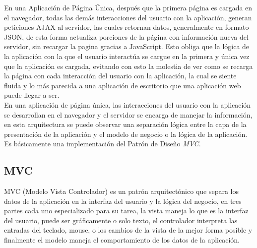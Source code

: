En una Aplicación de Página Única, después que la primera página es cargada en el navegador, todas las demás interacciones del usuario con la aplicación, generan peticiones AJAX al servidor, las cuales retornan datos, generalmente en formato JSON, de esta forma actualiza porciones de la página con información nueva del servidor, sin recargar la pagina gracias a JavaScript. Esto obliga que la lógica de la aplicación con la que el usuario interactúa se cargue en la primera y única vez que la aplicación es cargada, evitando con esto la molestia de ver como se recarga la página con cada interacción del usuario con la aplicación, la cual se siente fluida y lo más parecida a una aplicación de escritorio que una aplicación web puede llegar a ser.\\





%

En una aplicación de página única, las interacciones del usuario con la aplicación se desarrollan en el navegador y el servidor se encarga de manejar la información, en esta arquitectura se puede observar una separación lógica entre la capa de la presentación de la aplicación y el modelo de negocio o la lógica de la aplicación. Es básicamente una implementación del Patrón de Diseño \emph{MVC}.\\


\subsection{MVC} %
\label{sub:mvc}
  MVC (Modelo Vista  Controlador) es un patrón arquitectónico que separa
  los datos de la aplicación en la interfaz del usuario y  la lógica del
  negocio, en tres partes cada uno especializado para su tarea, la vista
  maneja lo que es la interfaz del usuario, puede ser gráficamente o solo texto,
  el controlador interpreta las entradas del teclado, mouse, o los cambios
  de la vista de la mejor forma posible y finalmente el modelo maneja el comportamiento
  de los datos de la aplicación.\cite{steveburbeck1992}\\

